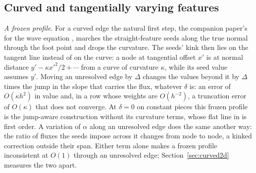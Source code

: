 \documentclass[11pt]{amsart}
\theoremstyle{definition}
\theoremstyle{remark}
\newcommand{\para}[1]{\par\smallskip\noindent\textit{#1}.\enspace}
\begin{document}
\subsection{Curved and tangentially varying features}
\label{sec:curved}
\para{A frozen profile}
For a curved edge the natural first step, the companion paper's for the
wave equation \cite{Martin2026seeds}, marches the straight-feature seeds
along the true normal through the foot point and drops the curvature. The
seeds' kink then lies on the tangent line instead of on the curve: a node
at tangential offset $x'$ is at normal distance $y' - \kappa x'^2 / 2 +
\cdots$ from a curve of curvature $\kappa$, while its seed value assumes
$y'$. Moving an unresolved edge by $\Delta$ changes the values beyond it by
$\Delta$ times the jump in the slope that carries the flux, whatever
$\delta$ is: an error of $O(\kappa h^2)$ in value and, in a row whose weights
are $O(h^{-2})$, a truncation error of $O(\kappa)$ that does not converge.
At $\delta = 0$ on constant pieces this frozen profile is the jump-aware
construction without its curvature terms, whose flat line in \cite[Fig.~10]{MartinFornberg2017heat}
is first order. A variation of $\alpha$ along an unresolved edge does the
same another way: the ratio of fluxes the seeds impose across it changes
from node to node, a kinked correction outside their span. Either term alone
makes a frozen profile inconsistent at $O(1)$ through an unresolved edge;
Section~\ref{sec:curved2d} measures the two apart.
\end{document}
